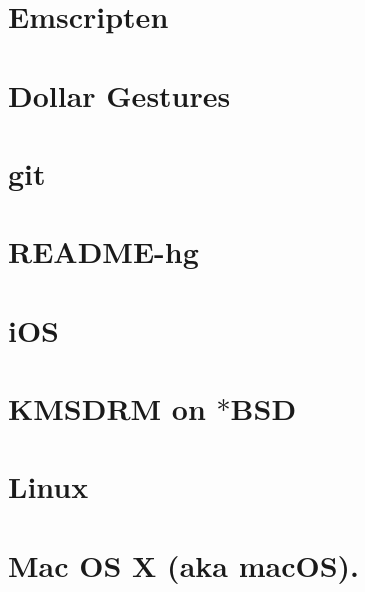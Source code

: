 \documentclass[twoside]{book}
\newcommand{\+}{\discretionary{\mbox{\scriptsize$\hookleftarrow$}}{}{}}
\begin{document}
\chapter{Emscripten}
\label{md__d___ray_tracing_docs__r_e_a_d_m_e_emscripten}

\chapter{Dollar Gestures}
\label{md__d___ray_tracing_docs__r_e_a_d_m_e_gesture}

\chapter{git}
\label{md__d___ray_tracing_docs__r_e_a_d_m_e_git}

\chapter{README-\/hg}
\label{md__d___ray_tracing_docs__r_e_a_d_m_e_hg}

\chapter{i\+OS}
\label{md__d___ray_tracing_docs__r_e_a_d_m_e_ios}

\chapter{KMSDRM on $\ast$\+BSD}
\label{md__d___ray_tracing_docs__r_e_a_d_m_e_kmsbsd}

\chapter{Linux}
\label{md__d___ray_tracing_docs__r_e_a_d_m_e_linux}

\chapter{Mac OS X (aka mac\+OS).}
\label{md__d___ray_tracing_docs__r_e_a_d_m_e_macos}

\end{document}
